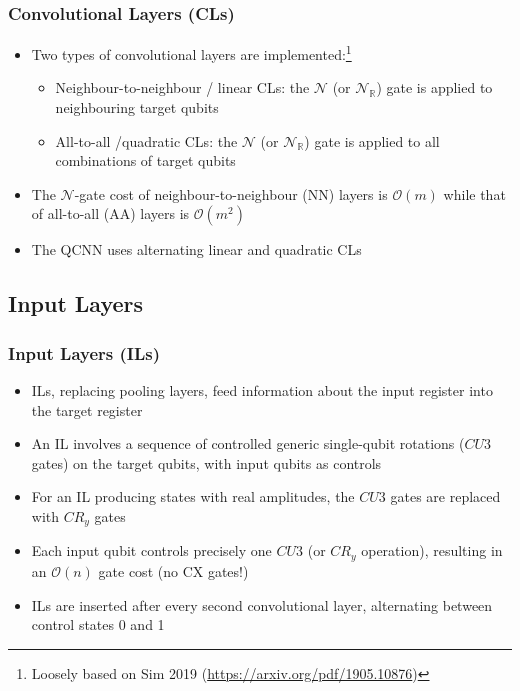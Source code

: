 \documentclass{beamer}
\begin{document}
\begin{frame}
\frametitle{Convolutional Layers (CLs)}
\begin{itemize}
\item Two types of convolutional layers are implemented:\footnote{Loosely based on Sim 2019 (\url{https://arxiv.org/pdf/1905.10876})}
\begin{itemize}
\item \alert{Neighbour-to-neighbour / linear CLs}: the $\mathcal{N}$ (or $\mathcal{N}_\mathbb{R}$) gate is applied to neighbouring target qubits 
\item \alert{All-to-all /quadratic CLs}: the $\mathcal{N}$ (or $\mathcal{N}_\mathbb{R}$) gate is applied to all combinations of target qubits
\end{itemize}
\item The $\mathcal{N}$-gate cost of neighbour-to-neighbour (NN) layers is \alert{$\mathcal{O}(m)$} while that of all-to-all (AA) layers is \alert{$\mathcal{O}(m^2)$}
\item The QCNN uses alternating linear and quadratic CLs
\end{itemize}
\end{frame} 

\begin{frame}
\subsection{Input Layers}
\frametitle{Input Layers (ILs)}
\begin{itemize}
\item ILs, replacing pooling layers, feed information about the input register into the target register 
\item An IL involves a sequence of controlled generic single-qubit rotations (\alert{$CU3$ gates}) on the target qubits, with input qubits as controls
\item For an IL producing states with \alert{real} amplitudes, the $CU3$ gates are replaced with \alert{$CR_y$ gates}
\item Each input qubit controls precisely one $CU3$ (or $CR_y$ operation), resulting in an \alert{$\mathcal{O}(n)$} gate cost (no CX gates!)
\item ILs are inserted after every second convolutional layer, alternating between control states 0 and 1  
\end{itemize}
\end{frame}
\end{document}

